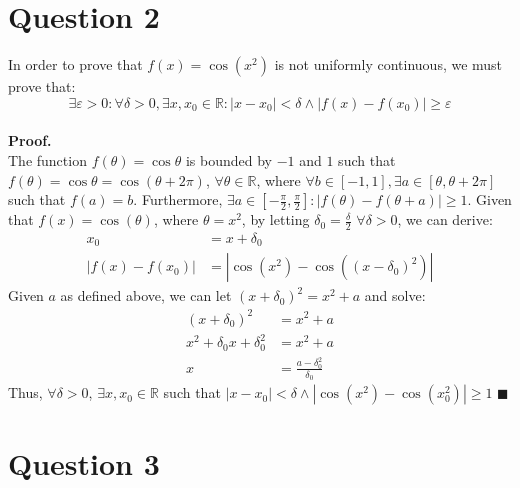 \documentclass{article}
\newcommand{\R}{\mathbb{R}}
\begin{document}
\section*{Question 2}

In order to prove that $f(x)=\cos (x^2)$ is not uniformly continuous, we must prove that:
\[
	\exists \varepsilon>0:\forall\delta>0,\exists x,x_0\in\R: |x-x_0|<\delta\wedge|f(x)-f(x_0)|\geq\varepsilon
\]
\medskip \\
\textbf{Proof.}
\smallskip \\
The function $f(\theta)=\cos\theta$ is bounded by $-1$ and $1$ such that $f(\theta)=\cos\theta=\cos(\theta+2\pi)$, $\forall\theta\in\R$, where $\forall b\in[-1,1], \exists a\in[\theta,\theta+2\pi]$ such that $f(a)=b$.   Furthermore, $\exists a\in[-\frac{\pi}{2},\frac{\pi}{2}]:|f(\theta)-f(\theta+a)|\geq 1$. Given that $f(x)=\cos(\theta)$, where $\theta = x^2$, by letting $\delta_0=\frac{\delta}{2}$ $\forall\delta>0$, we can derive:
\begin{align*}
	x_0 			&= x + \delta_0						\\
	|f(x)-f(x_0)| 	&= |\cos(x^2)-\cos((x-\delta_0)^2)|
\end{align*}
Given $a$ as defined above, we can let $(x+\delta_0)^2 = x^2 + a$ and solve:
\begin{align*}
	(x+\delta_0)^2				&= x^2 + a							\\
	x^2+\delta_0 x + \delta_0^2	&= x^2 + a							\\
	x							&= \frac{a-\delta_0^2}{\delta_0}
\end{align*}
Thus, $\forall \delta>0$, $\exists x,x_0\in\R$ such that $|x-x_0|<\delta\wedge|\cos(x^2)-\cos(x_0^2)|\geq 1$ $\blacksquare$


\section*{Question 3}
\end{document}
